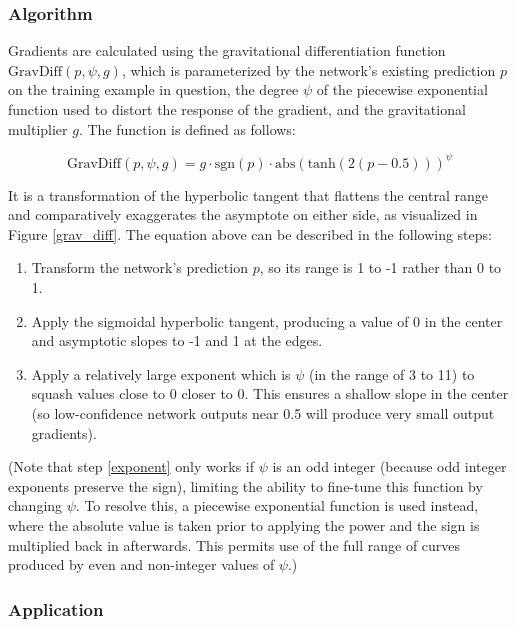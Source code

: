 \documentclass[10pt]{article}
\begin{document}
\subsubsection{Algorithm}

Gradients are calculated using the gravitational differentiation function $\mathrm{GravDiff}(p, \psi, g)$, which is parameterized by the network's existing prediction $p$ on the training example in question, the degree $\psi$ of the piecewise exponential function used to distort the response of the gradient, and the gravitational multiplier $g$. The function is defined as follows:

\begin{equation}
    \mathrm{GravDiff}(p, \psi, g) = g \cdot \mathrm{sgn}(p) \cdot \mathrm{abs}(\mathrm{tanh}(2(p - 0.5))) ^ \psi
\end{equation}

It is a transformation of the hyperbolic tangent that flattens the central range and comparatively exaggerates the asymptote on either side, as visualized in Figure \ref{grav_diff}. The equation above can be described in the following steps:

\begin{enumerate}
    \item Transform the network's prediction $p$, so its range is 1 to -1 rather than 0 to 1.
    \item Apply the sigmoidal hyperbolic tangent, producing a value of 0 in the center and asymptotic slopes to -1 and 1 at the edges.
    \item \label{exponent} Apply a relatively large exponent which is $\psi$ (in the range of 3 to 11) to squash values close to 0 closer to 0. This ensures a shallow slope in the center (so low-confidence network outputs near 0.5 will produce very small output gradients).
\end{enumerate}

(Note that step \ref{exponent} only works if $\psi$ is an odd integer (because odd integer exponents preserve the sign), limiting the ability to fine-tune this function by changing $\psi$. To resolve this, a piecewise exponential function is used instead, where the absolute value is taken prior to applying the power and the sign is multiplied back in afterwards. This permits use of the full range of curves produced by even and non-integer values of $\psi$.)

\subsubsection{Application}
\end{document}
